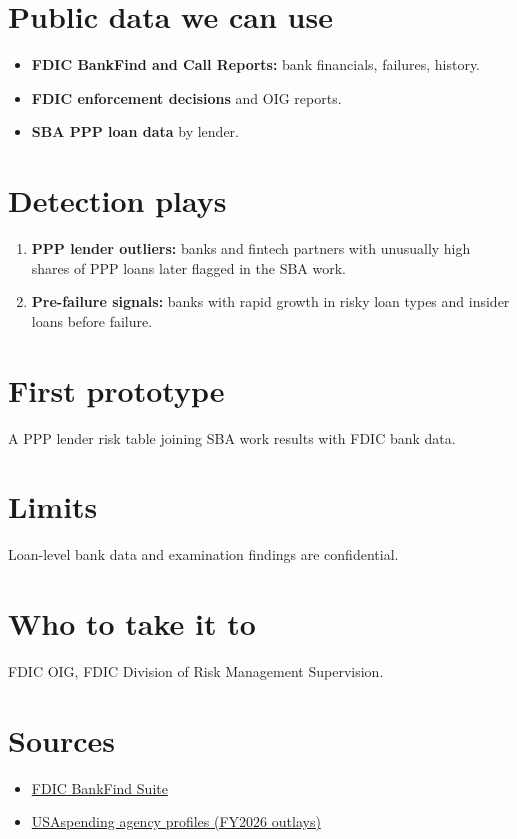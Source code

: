 \documentclass[letterpaper,11pt]{article}
\providecommand{\tightlist}{\setlength{\itemsep}{0pt}\setlength{\parskip}{0pt}}
\begin{document}
\hypertarget{public-data-we-can-use}{%
\section{Public data we can use}\label{public-data-we-can-use}}

\begin{itemize}
\tightlist
\item
  \textbf{FDIC BankFind and Call Reports:} bank financials, failures,
  history.
\item
  \textbf{FDIC enforcement decisions} and OIG reports.
\item
  \textbf{SBA PPP loan data} by lender.
\end{itemize}

\hypertarget{detection-plays}{%
\section{Detection plays}\label{detection-plays}}

\begin{enumerate}
\def\labelenumi{\arabic{enumi}.}
\tightlist
\item
  \textbf{PPP lender outliers:} banks and fintech partners with
  unusually high shares of PPP loans later flagged in the SBA work.
\item
  \textbf{Pre-failure signals:} banks with rapid growth in risky loan
  types and insider loans before failure.
\end{enumerate}

\hypertarget{first-prototype}{%
\section{First prototype}\label{first-prototype}}

A PPP lender risk table joining SBA work results with FDIC bank data.

\hypertarget{limits}{%
\section{Limits}\label{limits}}

Loan-level bank data and examination findings are confidential.

\hypertarget{who-to-take-it-to}{%
\section{Who to take it to}\label{who-to-take-it-to}}

FDIC OIG, FDIC Division of Risk Management Supervision.

\hypertarget{sources}{%
\section{Sources}\label{sources}}

\begin{itemize}
\tightlist
\item
  \href{https://banks.data.fdic.gov/}{FDIC BankFind Suite}
\item
  \href{https://www.usaspending.gov/agency}{USAspending agency profiles
  (FY2026 outlays)}
\end{itemize}
\end{document}
